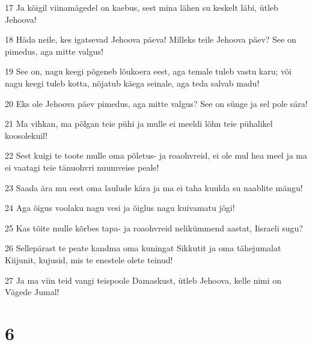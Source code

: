 \par 17 Ja kõigil viinamägedel on kaebus, sest mina lähen su keskelt läbi, ütleb Jehoova!
\par 18 Häda neile, kes igatsevad Jehoova päeva! Milleks teile Jehoova päev? See on pimedus, aga mitte valgus!
\par 19 See on, nagu keegi põgeneb lõukoera eest, aga temale tuleb vastu karu; või nagu keegi tuleb kotta, nõjatub käega seinale, aga teda salvab madu!
\par 20 Eks ole Jehoova päev pimedus, aga mitte valgus? See on sünge ja sel pole sära!
\par 21 Ma vihkan, ma põlgan teie pühi ja mulle ei meeldi lõhn teie pühalikel koosolekuil!
\par 22 Sest kuigi te toote mulle oma põletus- ja roaohvreid, ei ole mul hea meel ja ma ei vaatagi teie tänuohvri nuumveise peale!
\par 23 Saada ära mu eest oma laulude kära ja ma ei taha kuulda su naablite mängu!
\par 24 Aga õigus voolaku nagu vesi ja õiglus nagu kuivamatu jõgi!
\par 25 Kas tõite mulle kõrbes tapa- ja roaohvreid nelikümmend aastat, Iisraeli sugu?
\par 26 Sellepärast te peate kandma oma kuningat Sikkutit ja oma tähejumalat Kiijunit, kujusid, mis te enestele olete teinud!
\par 27 Ja ma viin teid vangi teispoole Damaskust, ütleb Jehoova, kelle nimi on Vägede Jumal!

\chapter{6}

